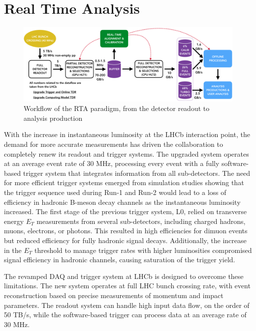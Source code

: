 \section{Real Time Analysis}
\begin{figure}
    \centering
    \includegraphics[width=\textwidth]{figures/hidef_RTA_dataflow_widescreen.png}
    \caption{Workflow of the RTA paradigm, from the detector readout to analysis production}
    \label{fig:RTA}
\end{figure}
With the increase in instantaneous luminosity at the LHCb interaction point, the demand for more accurate measurements has driven the collaboration to completely renew its readout and trigger systems. The upgraded system operates at an average event rate of 30 MHz, processing every event with a fully software-based trigger system that integrates information from all sub-detectors. The need for more efficient trigger systems emerged from simulation studies showing that the trigger sequence used during Run-1 and Run-2 would lead to a loss of efficiency in hadronic B-meson decay channels as the instantaneous luminosity increased\cite{CERN-LHCC-2011-001}. The first stage of the previous trigger system, L0, relied on transverse energy $E_T$ measurements from several sub-detectors, including charged hadrons, muons, electrons, or photons. This resulted in high efficiencies for dimuon events but reduced efficiency for fully hadronic signal decays. Additionally, the increase in the $E_T$ threshold to manage trigger rates with higher luminosities compromised signal efficiency in hadronic channels, causing saturation of the trigger yield.

The revamped DAQ and trigger system at LHCb is designed to overcome these limitations\cite{CERN-LHCC-2018-014}. The new system operates at full LHC bunch crossing rate, with event reconstruction based on precise measurements of momentum and impact parameters. The readout system can handle high input data flow, on the order of 50 TB/s, while the software-based trigger can process data at an average rate of 30 MHz.

